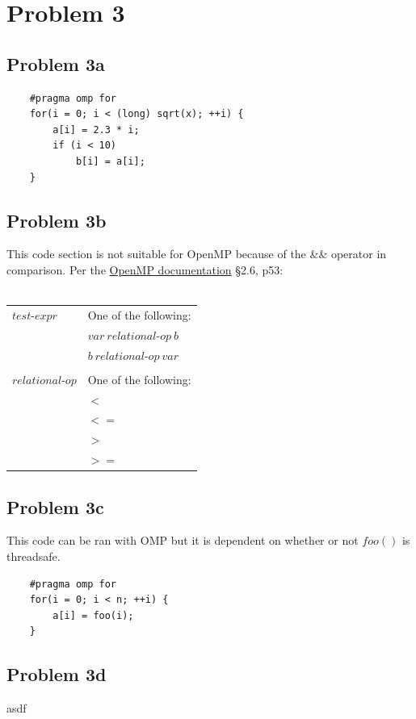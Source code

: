 \documentclass{article}
\begin{document}
\section{Problem 3}
\subsection{Problem 3a}
\begin{verbatim}
    #pragma omp for
    for(i = 0; i < (long) sqrt(x); ++i) {
        a[i] = 2.3 * i;
        if (i < 10) 
            b[i] = a[i];
    }
\end{verbatim}

\subsection{Problem 3b}
This code section is not suitable for OpenMP because of the \&\& operator in comparison.
Per the \hyperlink{https://www.openmp.org/wp-content/uploads/openmp-4.5.pdf}{OpenMP documentation} \S2.6, p53:\\\\
\begin{tabular}{@{}ll}
$test$-$expr$ & One of the following:\\
& $var\ relational$-$op\ b$\\
& $b\ relational$-$op\ var$\\\\

$relational$-$op$ & One of the following:\\
& $<$  \\
& $<=$ \\
& $>$  \\
& $>=$ \\
\end{tabular}

\subsection{Problem 3c}
This code can be ran with OMP but it is dependent on whether or not $foo()$ is threadsafe.
\begin{verbatim}
    #pragma omp for
    for(i = 0; i < n; ++i) {
        a[i] = foo(i);
    }
\end{verbatim}

\subsection{Problem 3d}
asdf
\end{document}
